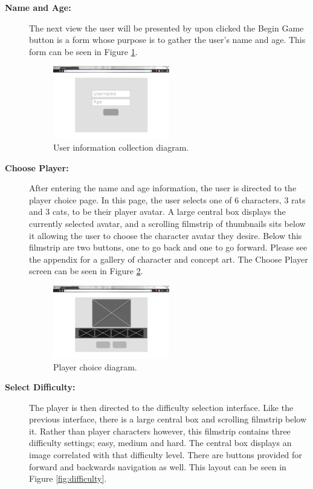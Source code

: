 \documentclass[12pt]{IEEEtran}
\begin{document}
\begin{description}
	\item[\textbf{Name and Age:}] \hspace{4em} The next view the user will be presented by upon clicked the Begin Game button is a form whose purpose is to gather the user’s name and age. This form can be seen in Figure \ref{fig:userinfo}.
	
	\begin{figure}[h]
		\centering
		\includegraphics[width=0.5\textwidth]{3_UsernameAge.jpg}
		\caption{User information collection diagram. }
		\label{fig:userinfo}
	\end{figure}
	
	\item[\textbf{Choose Player:}] \hspace{4em} After entering the name and age information, the user is directed to the player choice page. In this page, the user selects one of 6 characters, 3 rats and 3 cats, to be their player avatar. A large central box displays the currently selected avatar, and a scrolling filmstrip of thumbnails sits below it allowing the user to choose the character avatar they desire. Below this filmstrip are two buttons, one to go back and one to go forward. Please see the appendix for a gallery of character and concept art. The Choose Player screen can be seen in Figure \ref{fig:chooseplayer}. 
	
	\begin{figure}[h]
		\centering
		\includegraphics[width=0.5\textwidth]{4_ChoosePlayer.jpg}
		\caption{Player choice diagram. }
		\label{fig:chooseplayer}
	\end{figure}	
	
	\item[\textbf{Select Difficulty:}] \hspace{5em}The player is then directed to the difficulty selection interface. Like the previous interface, there is a large central box and scrolling filmstrip below it. Rather than player characters however, this filmstrip contains three difficulty settings; easy, medium and hard. The central box displays an image correlated with that difficulty level. There are buttons provided for forward and backwards navigation as well. This layout can be seen in Figure \ref{fig:difficulty}.
	

\end{description}
\end{document}
